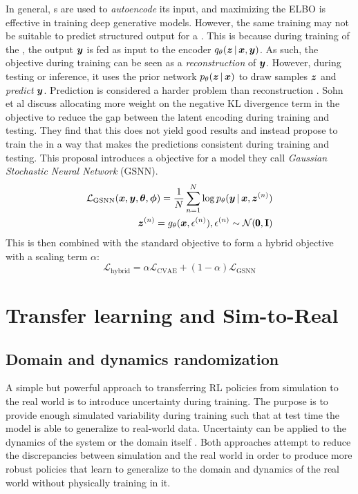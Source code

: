 In general, \vae{}s are used to \emph{autoencode} its input, and maximizing the ELBO is effective in training deep generative models. However, the same training may not be suitable to predict structured output for a \cvae{}. This is because during training of the \cvae{}, the output $\boldsymbol{y}$ is fed as input to the encoder $q_{\theta}\given{\vz}{\vx, \vy}$. As such, the objective during training can be seen as a \emph{reconstruction} of $\boldsymbol{y}$. However, during testing or inference, it uses the prior network $p_{\theta}\given{\vz}{\vx}$ to draw samples $\boldsymbol{z}$ and \emph{predict} $\boldsymbol{y}$. Prediction is considered a harder problem than reconstruction \parencite{Sohn2015}. Sohn et al discuss allocating more weight on the negative KL divergence term in the objective to reduce the gap between the latent encoding during training and testing. They find that this does not yield good results and instead propose to train the \cvae{} in a way that makes the predictions consistent during training and testing. This proposal introduces a objective for a model they call \emph{Gaussian Stochastic Neural Network} (GSNN).
\begin{equation}
\begin{split}
\mathcal{L}_{\text{GSNN}}(\vx, \vy, \vth, \vph) = \frac{1}{N} \sum_{n=1}^N \log p_\theta \given{\vy}{\vx, \vz^{(n)}}
\\
\vz^{(n)} = g_{\theta}(\vx, \epsilon^{(n)}), \epsilon^{(n)} \sim \mathcal{N}(\pmb{0}, \mathbf{I})
\end{split}
\end{equation}
This is then combined with the standard \cvae{} objective to form a hybrid objective with a scaling term $\alpha$:
\begin{equation}
\mathcal{L}_{\text{hybrid}} = \alpha \mathcal{L}_{\text{CVAE}} + (1 - \alpha) \mathcal{L}_{\text{GSNN}}
\end{equation}

\section{Transfer learning and Sim-to-Real}
\subsection{Domain and dynamics randomization}

A simple but powerful approach to transferring RL policies from simulation to the real world is to introduce uncertainty during training. The purpose is to provide enough simulated variability during training such that at test time the model is able to generalize to real-world data. Uncertainty can be applied to the dynamics of the system \parencite{Antonova2017}\parencite{peng} or the domain itself \parencite{tobin}. Both approaches attempt to reduce the discrepancies between simulation and the real world in order to produce more robust policies that learn to generalize to the domain and dynamics of the real world without physically training in it. 

